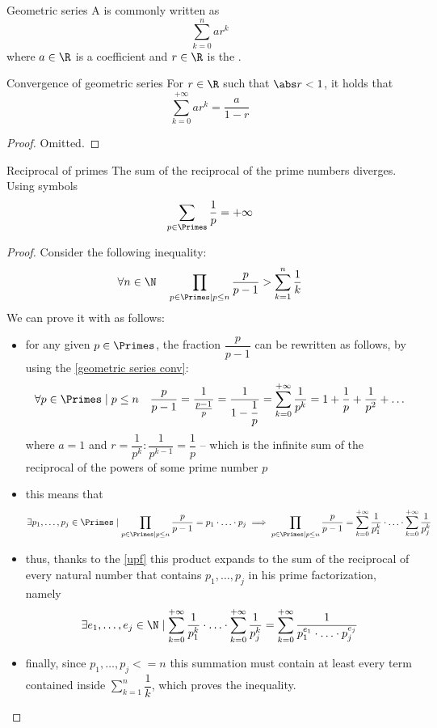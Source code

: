 \documentclass[a4paper, 12pt]{report}
\begin{document}
    \begin{frameddefn}{Geometric series}
        A  is commonly written as $$\sum_{k = 0}^n{ar^k}$$ where $a \in \R$ is a coefficient and $r \in \R$ is the .
    \end{frameddefn}

    \begin{framedprop}[label={geometric series conv}]{Convergence of geometric series}
        For $r \in \R$ such that $\abs r < 1$, it holds that $$\sum_{k = 0}^{+ \infty}{ar^k} = \dfrac{a}{1 - r}$$
    \end{framedprop}

    \begin{proof}
        Omitted.
    \end{proof}

    \begin{framedthm}{Reciprocal of primes}
        The sum of the reciprocal of the prime numbers diverges. Using symbols $$\sum_{p \in \Primes}{\dfrac{1}{p}} = + \infty$$
    \end{framedthm}

    \begin{proof}
        Consider the following inequality: $$\forall n \in \N \quad \prod_{p \in \Primes \mid p \le n}{\dfrac{p}{p - 1}} > \sum_{k = 1}^{n}{\dfrac{1}{k}}$$ We can prove it with as follows:

        \begin{itemize}
            \item for any given $p \in \Primes$, the fraction $\dfrac{p}{p - 1}$ can be rewritten as follows, by using the \cref{geometric series conv}: $$\forall p \in \Primes \mid p \leq n \quad \dfrac{p}{p - 1} = \dfrac{1}{\frac{p - 1}{p}} = \dfrac{1}{1 - \dfrac{1}{p}} = \sum_{k = 0}^{+ \infty}{\dfrac{1}{p^k}} = 1 + \dfrac{1}{p} + \dfrac{1}{p^2} + \ldots$$ where $a = 1$ and $r = \dfrac{1}{p^k} : \dfrac{1}{p^{k -1}} = \dfrac{1}{p}$ -- which is the infinite sum of the reciprocal of the powers of some prime number $p$
            \item this means that $$\exists p_1, \ldots, p_j \in \Primes \mid \prod_{p \in \Primes \mid p \le n}{\dfrac{p}{p - 1}} = p_1 \cdot \ldots \cdot p_j  \implies \prod_{p \in \Primes \mid p \le n}{\dfrac{p}{p - 1}} =  \sum_{k = 0}^{+ \infty}{\dfrac{1}{p_1^k}} \cdot \ldots \cdot  \sum_{k = 0}^{+ \infty}{\dfrac{1}{p_j^k}}$$
            \item thus, thanks to the \cref{upf} this product expands to the sum of the reciprocal of every natural number that contains $p_1, \ldots, p_j$ in his prime factorization, namely $$\exists e_1, \ldots, e_j \in \N \mid\sum_{k = 0}^{+ \infty}{\dfrac{1}{p_1^k}} \cdot \ldots \cdot  \sum_{k = 0}^{+ \infty}{\dfrac{1}{p_j^k}} = \sum_{k = 0}^{+ \infty}{\dfrac{1}{p_1^{e_1} \cdot \ldots \cdot p_j^{e_j}}}$$
            \item finally, since $p_1, \ldots, p_j <= n$ this summation must contain at least every term contained inside $\displaystyle \sum_{k = 1}^{n}{\dfrac{1}{k}}$, which proves the inequality.
        \end{itemize}
    \end{proof}
\end{document}
